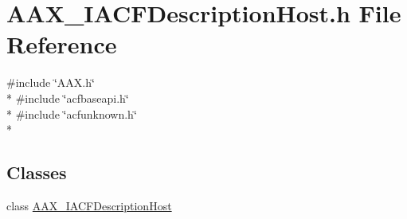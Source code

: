 \hypertarget{a00220}{}\section{A\+A\+X\+\_\+\+I\+A\+C\+F\+Description\+Host.\+h File Reference}
\label{a00220}
{\ttfamily \#include \char`\"{}A\+A\+X.\+h\char`\"{}}\\*
{\ttfamily \#include \char`\"{}acfbaseapi.\+h\char`\"{}}\\*
{\ttfamily \#include \char`\"{}acfunknown.\+h\char`\"{}}\\*
\subsection*{Classes}
\begin{DoxyCompactItemize}
\item 
class \hyperlink{a00056}{A\+A\+X\+\_\+\+I\+A\+C\+F\+Description\+Host}
\end{DoxyCompactItemize}
